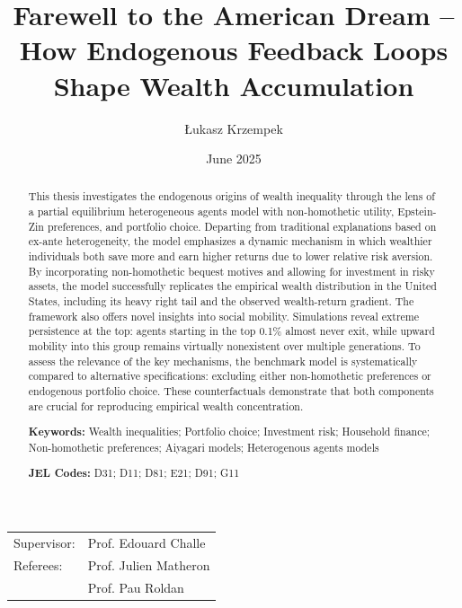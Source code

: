 \documentclass[12pt]{article}
\title{
\centering
\textbf{\LARGE Farewell to the American Dream --}\\
\textbf{\LARGE How Endogenous Feedback Loops Shape Wealth Accumulation}
}
\author{{\large Łukasz Krzempek}}
\date{June 2025}
\begin{document}
\maketitle

\vfill

\begin{center}
\begin{tabular}{ll}
Supervisor: & Prof. Edouard Challe \\
Referees:   & Prof. Julien Matheron \\
            & Prof. Pau Roldan \\
\end{tabular}\\[0.5em]
\end{center}

\newpage

\begin{abstract}
\noindent
This thesis investigates the endogenous origins of wealth inequality through the lens of a partial equilibrium heterogeneous agents model with non-homothetic utility, Epstein-Zin preferences, and portfolio choice. Departing from traditional explanations based on ex-ante heterogeneity, the model emphasizes a dynamic mechanism in which wealthier individuals both save more and earn higher returns due to lower relative risk aversion. By incorporating non-homothetic bequest motives and allowing for investment in risky assets, the model successfully replicates the empirical wealth distribution in the United States, including its heavy right tail and the observed wealth-return gradient. The framework also offers novel insights into social mobility. Simulations reveal extreme persistence at the top: agents starting in the top 0.1\% almost never exit, while upward mobility into this group remains virtually nonexistent over multiple generations. To assess the relevance of the key mechanisms, the benchmark model is systematically compared to alternative specifications: excluding either non-homothetic preferences or endogenous portfolio choice. These counterfactuals demonstrate that both components are crucial for reproducing empirical wealth concentration.

\vspace{1em}
\noindent\textbf{Keywords:} Wealth inequalities; Portfolio choice; Investment risk; Household finance; Non-homothetic preferences; Aiyagari models; Heterogenous agents models

\vspace{0.3em}
\noindent\textbf{JEL Codes:} D31; D11; D81; E21; D91; G11
\end{abstract}
\end{document}
